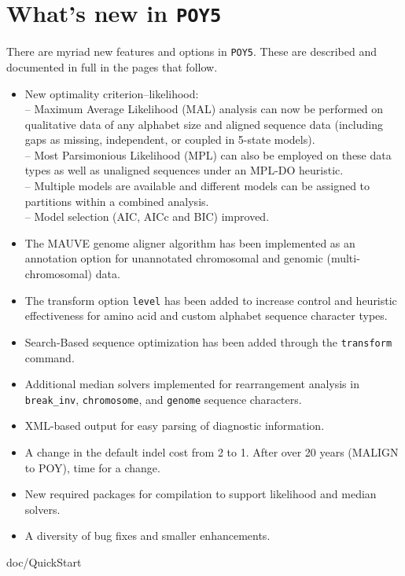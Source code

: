 \documentclass[11pt]{book}
\newcommand{\commandstyle}[1]{\texttt{#1}}
\newcommand{\poy}{\commandstyle{POY5}\xspace}
\begin{document}
\section{What's new in \poy}
There are myriad new features and options in \poy.  These are described and documented in full in the pages that follow.  
\begin{itemize}
\item{New optimality criterion--likelihood:\\
	-- Maximum Average Likelihood (MAL) analysis can now be performed on qualitative data of any alphabet size 
	and aligned sequence data (including gaps as missing, independent, or coupled in 5-state models).\\  
	-- Most Parsimonious Likelihood (MPL) can also be employed on these data types as well 
	as unaligned sequences under an MPL-DO heuristic.\\
	-- Multiple models are available and different models can be assigned to partitions within a combined analysis.\\
	-- Model selection (AIC, AICc and BIC) improved.}
\item{The MAUVE genome aligner algorithm has been implemented as an annotation option
for unannotated chromosomal and genomic (multi-chromosomal) data.}
\item{The transform option \texttt{level} has been added to increase control and heuristic effectiveness 
for amino acid and custom alphabet sequence character types.}
\item{Search-Based sequence optimization has been added through the \texttt{transform} command.}
\item{Additional median solvers implemented for rearrangement analysis in \texttt{break\_inv}, \texttt{chromosome}, 
and \texttt{genome} sequence characters.}
\item{XML-based output for easy parsing of diagnostic information.}
\item{A change in the default indel cost from 2 to 1.  After over 20 years (MALIGN to POY), time for a change.}
\item{New required packages for compilation to support likelihood and median solvers.}
\item{A diversity of bug fixes and smaller enhancements.}
\end{itemize}


 {doc/QuickStart}
\end{document}

